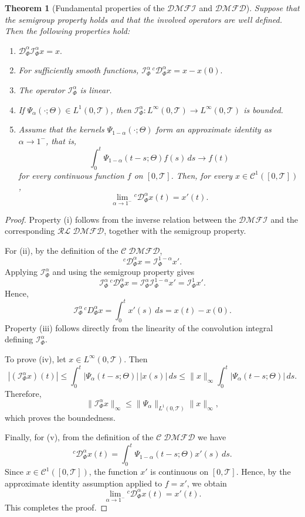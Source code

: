 \documentclass[11pt]{article}
\numberwithin{equation}{section}
\newtheorem{theorem}[definition]{Theorem}
\begin{document}
\begin{theorem}[Fundamental properties of the $\mathcal{DMFI}$ and $\mathcal{DMFD}$]
Suppose that the semigroup property holds and that the involved operators are well defined.
Then the following properties hold:
\begin{enumerate}[label=(\roman*),itemsep=2pt,topsep=2pt]
\item
\(
\mathcal D_\Phi^\alpha \mathcal I_\Phi^\alpha x=x.
\)

\item
For sufficiently smooth functions,
\(
\mathcal I_\Phi^\alpha\,{}^c \mathcal D_\Phi^\alpha x=x-x(0).
\)

\item
The operator \(\mathcal I_\Phi^\alpha\) is linear.

\item
If \(\Psi_\alpha(\cdot;\Theta)\in L^1(0,\mathcal{T})\), then
\(
\mathcal I_\Phi^\alpha:L^\infty(0,\mathcal{T})\to L^\infty(0,\mathcal{T})
\)
is bounded.

\item
Assume that the kernels \(\Psi_{1-\alpha}(\cdot;\Theta)\) form an approximate identity as
\(\alpha\to1^{-}\), that is,
\[
\int_0^t \Psi_{1-\alpha}(t-s;\Theta)f(s)\,ds \longrightarrow f(t)
\]
for every continuous function \(f\) on \([0,\mathcal{T}]\). Then, for every \(x\in \mathcal{C}^1([0,\mathcal{T}])\),
\[
\lim_{\alpha\to1^-}{}^c \mathcal{D}_\Phi^\alpha x(t)=x'(t).
\]
\end{enumerate}
\end{theorem}

\begin{proof}
Property (i) follows from the inverse relation between the $\mathcal{DMFI}$ and the corresponding $\mathcal{RL\;DMFD}$, together
with the semigroup property.

For (ii), by the definition of the $\mathcal{C\;DMFD}$,
\[
{}^c \mathcal D_\Phi^\alpha x=\mathcal I_\Phi^{1-\alpha}x'.
\]
Applying \( \mathcal I_\Phi^\alpha\) and using the semigroup property gives
\[
\mathcal I_\Phi^\alpha\,{}^c \mathcal D_\Phi^\alpha x
=
\mathcal I_\Phi^\alpha \mathcal I_\Phi^{1-\alpha}x'
=
\mathcal I_\Phi^1x'.
\]
Hence,
\[
\mathcal I_\Phi^\alpha\,{}^cD_\Phi^\alpha x
=
\int_0^t x'(s)\,ds
=
x(t)-x(0).
\]
Property (iii) follows directly from the linearity of the convolution integral defining
\(\mathcal I_\Phi^\alpha\).

To prove (iv), let \(x\in L^\infty(0,\mathcal T)\). Then
\[
|(\mathcal I_\Phi^\alpha x)(t)|
\le
\int_0^t |\Psi_\alpha(t-s;\Theta)|\,|x(s)|\,ds
\le
\|x\|_\infty \int_0^t |\Psi_\alpha(t-s;\Theta)|\,ds.
\]
Therefore,
\[
\|\mathcal I_\Phi^\alpha x\|_\infty
\le
\|\Psi_\alpha\|_{L^1(0,\mathcal T)}\|x\|_\infty,
\]
which proves the boundedness.

Finally, for (v), from the definition of the $\mathcal{C\;DMFD}$ we have
\[
{}^c \mathcal D_\Phi^\alpha x(t)
=
\int_0^t \Psi_{1-\alpha}(t-s;\Theta)x'(s)\,ds.
\]
Since \(x\in \mathcal C^1([0,\mathcal T])\), the function \(x'\) is continuous on \([0,\mathcal T]\). Hence, by the
approximate identity assumption applied to \(f=x'\), we obtain
\[
\lim_{\alpha\to1^-}{}^c \mathcal D_\Phi^\alpha x(t)
=
x'(t).
\]
This completes the proof.
\end{proof}
\end{document}
